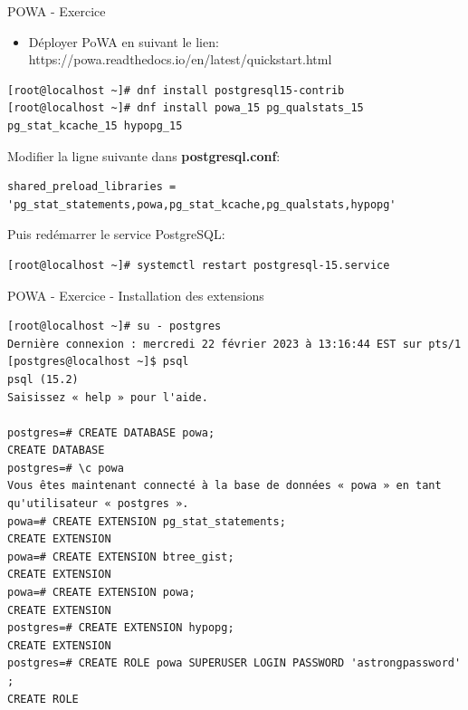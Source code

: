 
\begin{frame}[fragile]{POWA - Exercice }

   \begin{itemize}
      \item Déployer PoWA en suivant le lien: https://powa.readthedocs.io/en/latest/quickstart.html
   \end{itemize}

\begin{tiny}
\begin{Verbatim}[commandchars=\\\{\}]
[root@localhost ~]# dnf install postgresql15-contrib
[root@localhost ~]# dnf install powa_15 pg_qualstats_15 pg_stat_kcache_15 hypopg_15
\end{Verbatim}
\end{tiny}

   Modifier la ligne suivante dans \textbf{postgresql.conf}:

\begin{tiny}
\begin{Verbatim}[commandchars=\\\{\}]
shared_preload_libraries = 'pg_stat_statements,powa,pg_stat_kcache,pg_qualstats,hypopg'
\end{Verbatim}
\end{tiny}

Puis redémarrer le service PostgreSQL:
\begin{tiny}
\begin{Verbatim}[commandchars=\\\{\}]
[root@localhost ~]# systemctl restart postgresql-15.service
\end{Verbatim}
\end{tiny}

\end{frame}


\begin{frame}[fragile]{POWA - Exercice - Installation des extensions}

\begin{tiny}
\begin{Verbatim}[commandchars=\&\{\}]
[root@localhost ~]# su - postgres
Dernière connexion : mercredi 22 février 2023 à 13:16:44 EST sur pts/1
[postgres@localhost ~]$ psql
psql (15.2)
Saisissez « help » pour l'aide.

postgres=# CREATE DATABASE powa;
CREATE DATABASE
postgres=# \c powa
Vous êtes maintenant connecté à la base de données « powa » en tant qu'utilisateur « postgres ».
powa=# CREATE EXTENSION pg_stat_statements;
CREATE EXTENSION
powa=# CREATE EXTENSION btree_gist;
CREATE EXTENSION
powa=# CREATE EXTENSION powa;
CREATE EXTENSION
postgres=# CREATE EXTENSION hypopg;
CREATE EXTENSION
postgres=# CREATE ROLE powa SUPERUSER LOGIN PASSWORD 'astrongpassword' ;
CREATE ROLE
\end{Verbatim}
\end{tiny}

\end{frame}

